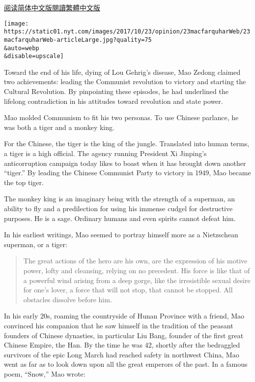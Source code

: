 \href{https://cn.nytimes.com/opinion/20171024/how-mao-molded-communism-to-create-a-new-china/}{阅读简体中文版}\href{https://cn.nytimes.com/opinion/20171024/how-mao-molded-communism-to-create-a-new-china/zh-hant/}{閱讀繁體中文版}

\texttt{[image: https://static01.nyt.com/images/2017/10/23/opinion/23macfarquharWeb/23macfarquharWeb-articleLarge.jpg?quality=75\\\&auto=webp\\\&disable=upscale]}

Toward the end of his life, dying of Lou Gehrig's disease, Mao Zedong
claimed two achievements: leading the Communist revolution to victory
and starting the Cultural Revolution. By pinpointing these episodes, he
had underlined the lifelong contradiction in his attitudes toward
revolution and state power.

Mao molded Communism to fit his two personas. To use Chinese parlance,
he was both a tiger and a monkey king.

For the Chinese, the tiger is the king of the jungle. Translated into
human terms, a tiger is a high official. The agency running President Xi
Jinping's anticorruption campaign today likes to boast when it has
brought down another ``tiger.'' By leading the Chinese Communist Party
to victory in 1949, Mao became the top tiger.

The monkey king is an imaginary being with the strength of a superman,
an ability to fly and a predilection for using his immense cudgel for
destructive purposes. He is a sage. Ordinary humans and even spirits
cannot defeat him.

In his earliest writings, Mao seemed to portray himself more as a
Nietzschean superman, or a tiger:

\begin{quote}
The great actions of the hero are his own, are the expression of his
motive power, lofty and cleansing, relying on no precedent. His force is
like that of a powerful wind arising from a deep gorge, like the
irresistible sexual desire for one's lover, a force that will not stop,
that cannot be stopped. All obstacles dissolve before him.
\end{quote}

In his early 20s, roaming the countryside of Hunan Province with a
friend, Mao convinced his companion that he saw himself in the tradition
of the peasant founders of Chinese dynasties, in particular Liu Bang,
founder of the first great Chinese Empire, the Han. By the time he was
42, shortly after the bedraggled survivors of the epic Long March had
reached safety in northwest China, Mao went as far as to look down upon
all the great emperors of the past. In a famous poem, ``Snow,'' Mao
wrote:

